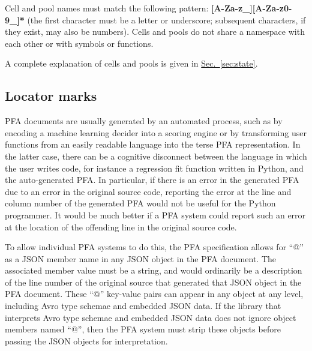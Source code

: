 \documentclass{article}
\newcommand{\PFAc}{\ttfamily\bfseries}
\theoremstyle{definition}
\begin{document}
Cell and pool names must match the following pattern: {\PFAc [A-Za-z\_][A-Za-z0-9\_]*} (the first character must be a letter or underscore; subsequent characters, if they exist, may also be numbers).  Cells and pools do not share a namespace with each other or with symbols or functions.

A complete explanation of cells and pools is given in \hyperlink{hsec:state}{Sec.~\ref{sec:state}}.

\subsection{Locator marks}

PFA documents are usually generated by an automated process, such as by encoding a machine learning decider into a scoring engine or by transforming user functions from an easily readable language into the terse PFA representation.  In the latter case, there can be a cognitive disconnect between the language in which the user writes code, for instance a regression fit function written in Python, and the auto-generated PFA.  In particular, if there is an error in the generated PFA due to an error in the original source code, reporting the error at the line and column number of the generated PFA would not be useful for the Python programmer.  It would be much better if a PFA system could report such an error at the location of the offending line in the original source code.

To allow individual PFA systems to do this, the PFA specification allows for ``@'' as a JSON member name in any JSON object in the PFA document.  The associated member value must be a string, and would ordinarily be a description of the line number of the original source that generated that JSON object in the PFA document.  These ``@'' key-value pairs can appear in any object at any level, including Avro type schemae and embedded JSON data.  If the library that interprets Avro type schemae and embedded JSON data does not ignore object members named ``@'', then the PFA system must strip these objects before passing the JSON objects for interpretation.
\end{document}
